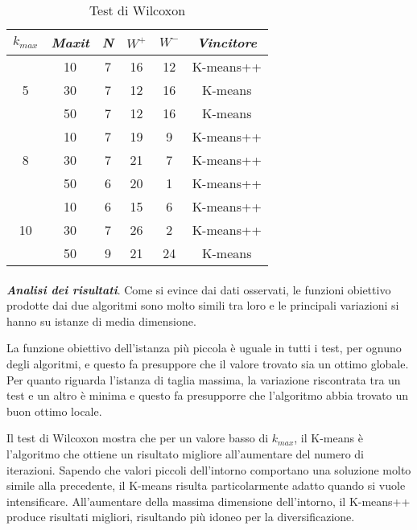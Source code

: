 \documentclass[12pt,a4paper,oneside,hidelinks]{report}
\begin{document}
\begin{table}[h]%
	\centering
	\caption{Test di Wilcoxon}\label{tab:b4}	

	\begin{tabular}{|c|c|c|c|c|c|}
			\hline

			$k_{max}$ & \textit{Maxit} & \textit{N} & $W^+$ & 
			$W^-$ & \textit{Vincitore} \\
			
			\hline		

			\multirow{3}{*}{5} 
			& 10 & 7 & 16 & 12 & K-means++ \\
			& 30 & 7 & 12 & 16 & K-means \\
			& 50 & 7 & 12 & 16 & K-means \\
			
			\hline
			
			\multirow{3}{*}{8} 
			& 10 & 7 & 19 & 9 & K-means++ \\
			& 30 & 7 & 21 & 7 & K-means++ \\
			& 50 & 6 & 20 & 1 & K-means++ \\
			
			\hline
			
			\multirow{3}{*}{10} 
			& 10 & 6 & 15 & 6 & K-means++ \\
			& 30 & 7 & 26 & 2 & K-means++ \\
			& 50 & 9 & 21 & 24 & K-means \\					

			\hline 
	\end{tabular}	
\end{table}

\paragraph*{}
\textbf{\textit{Analisi dei risultati}}. Come si evince dai dati osservati, le funzioni obiettivo prodotte dai due algoritmi sono molto simili tra loro e le principali variazioni si hanno su istanze di media dimensione. 

La funzione obiettivo dell'istanza più piccola è uguale in tutti i test, per ognuno degli algoritmi, e questo fa presuppore che il valore trovato sia un ottimo globale. Per quanto riguarda l'istanza di taglia massima, la variazione riscontrata tra un test e un altro è minima e questo fa presupporre che l'algoritmo abbia trovato un buon ottimo locale.

Il test di Wilcoxon mostra che per un valore basso di $k_{max}$, il K-means è l'algoritmo che ottiene un risultato migliore all'aumentare del numero di iterazioni. Sapendo che valori piccoli dell'intorno comportano una soluzione molto simile alla precedente, il K-means risulta particolarmente adatto quando si vuole intensificare. All'aumentare della massima dimensione dell'intorno, il K-means++ produce risultati migliori, risultando più idoneo per la diversificazione.
\end{document}
